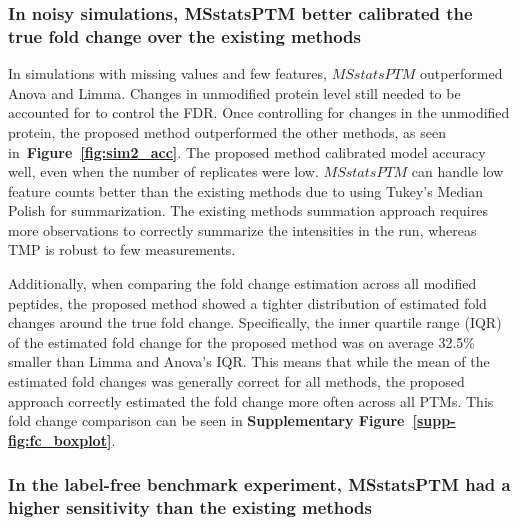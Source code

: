 \documentclass[mcp]{article}
\numberwithin{table}{section}
\def\figref#1{{\bf Figure~\ref{fig:#1}}}
\begin{document}
\subsubsection*{In noisy simulations, MSstatsPTM better calibrated the true fold change over the existing methods}

In simulations with missing values and few features, $MSstatsPTM$ outperformed Anova and Limma. Changes in unmodified protein level still needed to be accounted for to control the FDR. Once controlling for changes in the unmodified protein, the proposed method outperformed the other methods, as seen in~\figref{sim2_acc}. The proposed method calibrated model accuracy  well, even when the number of replicates were low. $MSstatsPTM$ can handle low feature counts better than the existing methods due to using Tukey's Median Polish for summarization. The existing methods summation approach requires more observations to correctly summarize the intensities in the run, whereas TMP is robust to few measurements.

Additionally, when comparing the fold change estimation across all modified peptides, the proposed method showed a tighter distribution of estimated fold changes around the true fold change. Specifically, the inner quartile range (IQR) of the estimated fold change for the proposed method was on average 32.5\% smaller than Limma and Anova's IQR. This means that while the mean of the estimated fold changes was generally correct for all methods, the proposed approach correctly estimated the fold change more often across all PTMs. This fold change comparison can be seen in {\bf Supplementary Figure~\ref{supp-fig:fc_boxplot}}.

\subsubsection*{In the label-free benchmark experiment, MSstatsPTM had a higher sensitivity than the existing methods}
\end{document}
